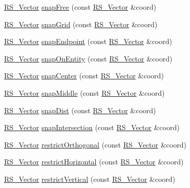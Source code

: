 \begin{DoxyCompactItemize}
\item 
\hyperlink{classRS__Vector}{R\-S\-\_\-\-Vector} \hyperlink{classRS__Snapper_a76b8755e51fc5a4f69580a745f00eb32}{snap\-Free} (const \hyperlink{classRS__Vector}{R\-S\-\_\-\-Vector} \&coord)
\item 
\hyperlink{classRS__Vector}{R\-S\-\_\-\-Vector} \hyperlink{classRS__Snapper_a1d226c6987a15806624238ce31421109}{snap\-Grid} (const \hyperlink{classRS__Vector}{R\-S\-\_\-\-Vector} \&coord)
\item 
\hyperlink{classRS__Vector}{R\-S\-\_\-\-Vector} \hyperlink{classRS__Snapper_a1ee916f188e5ad9d9858379e317f2224}{snap\-Endpoint} (const \hyperlink{classRS__Vector}{R\-S\-\_\-\-Vector} \&coord)
\item 
\hyperlink{classRS__Vector}{R\-S\-\_\-\-Vector} \hyperlink{classRS__Snapper_af8c91022716636213fca59d59da81c27}{snap\-On\-Entity} (const \hyperlink{classRS__Vector}{R\-S\-\_\-\-Vector} \&coord)
\item 
\hyperlink{classRS__Vector}{R\-S\-\_\-\-Vector} \hyperlink{classRS__Snapper_adcec796c8f3c476f15dc6bdfaef40ad4}{snap\-Center} (const \hyperlink{classRS__Vector}{R\-S\-\_\-\-Vector} \&coord)
\item 
\hyperlink{classRS__Vector}{R\-S\-\_\-\-Vector} \hyperlink{classRS__Snapper_a92164c13b467f4544be9184bd15643c8}{snap\-Middle} (const \hyperlink{classRS__Vector}{R\-S\-\_\-\-Vector} \&coord)
\item 
\hyperlink{classRS__Vector}{R\-S\-\_\-\-Vector} \hyperlink{classRS__Snapper_af5005c95c5c22c70240985f3eefd0d75}{snap\-Dist} (const \hyperlink{classRS__Vector}{R\-S\-\_\-\-Vector} \&coord)
\item 
\hyperlink{classRS__Vector}{R\-S\-\_\-\-Vector} \hyperlink{classRS__Snapper_a29cc6def6a25840e14a2a685c410239a}{snap\-Intersection} (const \hyperlink{classRS__Vector}{R\-S\-\_\-\-Vector} \&coord)
\item 
\hyperlink{classRS__Vector}{R\-S\-\_\-\-Vector} \hyperlink{classRS__Snapper_a9e43aa336439b308eaaa227beba79bd8}{restrict\-Orthogonal} (const \hyperlink{classRS__Vector}{R\-S\-\_\-\-Vector} \&coord)
\item 
\hyperlink{classRS__Vector}{R\-S\-\_\-\-Vector} \hyperlink{classRS__Snapper_a1094a5f20fe5cbe19d6484c5b7cf44de}{restrict\-Horizontal} (const \hyperlink{classRS__Vector}{R\-S\-\_\-\-Vector} \&coord)
\item 
\hyperlink{classRS__Vector}{R\-S\-\_\-\-Vector} \hyperlink{classRS__Snapper_a5d7af8520cb7b6e82995d4c35fe6ca25}{restrict\-Vertical} (const \hyperlink{classRS__Vector}{R\-S\-\_\-\-Vector} \&coord)

\end{DoxyCompactItemize}

